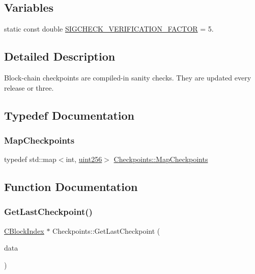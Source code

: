 \subsection*{Variables}
\begin{DoxyCompactItemize}
\item 
static const double \mbox{\hyperlink{namespace_checkpoints_a1ba658141a1d43d78b956b6952e0320c}{S\+I\+G\+C\+H\+E\+C\+K\+\_\+\+V\+E\+R\+I\+F\+I\+C\+A\+T\+I\+O\+N\+\_\+\+F\+A\+C\+T\+OR}} = 5.
\end{DoxyCompactItemize}


\subsection{Detailed Description}
Block-\/chain checkpoints are compiled-\/in sanity checks. They are updated every release or three. 

\subsection{Typedef Documentation}
\mbox{\label{namespace_checkpoints_a996cca530c4568a2eb4516e8f351b9a2}} 
\subsubsection{\texorpdfstring{Map\+Checkpoints}{MapCheckpoints}}
{\footnotesize\ttfamily typedef std\+::map$<$int, \mbox{\hyperlink{classuint256}{uint256}}$>$ \mbox{\hyperlink{namespace_checkpoints_a996cca530c4568a2eb4516e8f351b9a2}{Checkpoints\+::\+Map\+Checkpoints}}}



\subsection{Function Documentation}
\mbox{\label{namespace_checkpoints_afe6d974f9851567cd7f0c6066e0919b5}} 
\subsubsection{\texorpdfstring{Get\+Last\+Checkpoint()}{GetLastCheckpoint()}}
{\footnotesize\ttfamily \mbox{\hyperlink{class_c_block_index}{C\+Block\+Index}} $\ast$ Checkpoints\+::\+Get\+Last\+Checkpoint (\begin{DoxyParamCaption}\item[{const \mbox{\hyperlink{struct_checkpoints_1_1_c_checkpoint_data}{C\+Checkpoint\+Data}} \&}]{data }\end{DoxyParamCaption})}



